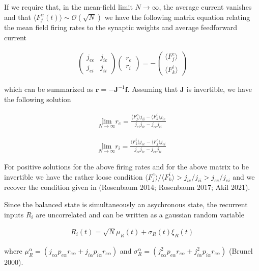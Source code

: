 \documentclass{ucetd}
\begin{document}
If we require that, in the mean-field limit $N\rightarrow\infty$, the average current vanishes and that $\langle F_{j}^{\alpha}(t)\rangle \sim \mathcal{O}(\sqrt{N})$ we have the following matrix equation relating the mean field firing rates to the synaptic weights and average feedforward current

\begin{align}
\begin{pmatrix}
j_{ee} & j_{ie}\\
j_{ei} & j_{ii}
\end{pmatrix}
\begin{pmatrix}
r_{e}\\
r_{i}
\end{pmatrix}
= 
-\begin{pmatrix}
\langle F_{j}^{e}\rangle\\
\langle F_{k}^{i}\rangle
\end{pmatrix}
\end{align}

which can be summarized as $\mathbf{r} = -\mathbf{J}^{-1}\mathbf{f}$. Assuming that $\mathbf{J}$ is invertible, we have the following solution

\begin{align}
\underset{N\rightarrow \infty}{\mathrm{lim}}r_{e} = \frac{\langle F_{j}^{e}\rangle j_{ii}-\langle F_{k}^{i}\rangle j_{ie}}{j_{ei}j_{ie} - j_{ee}j_{ii}}
\end{align}

\begin{align}
\underset{N\rightarrow \infty}{\mathrm{lim}}r_{i} = \frac{\langle F_{k}^{i}\rangle j_{ee}-\langle F_{j}^{e}\rangle j_{ei}}{j_{ei}j_{ie} - j_{ee}j_{ii}}
\end{align}

For positive solutions for the above firing rates and for the above matrix to be invertible we have the rather loose condition $\langle F_{j}^{e}\rangle/\langle F_{k}^{i}\rangle > j_{ie}/j_{ii} > j_{ee}/j_{ei}$ and we recover the condition given in (Rosenbaum 2014; Rosenbaum 2017; Akil 2021). 

Since the balanced state is simultaneously an asychronous state, the recurrent inputs $R_{i}$ are uncorrelated and can be written as a gaussian random variable

\begin{align*}
R_{i}(t) = \sqrt{N}\mu_{R}(t) + \sigma_{R}(t)\xi_{R}(t)
\end{align*}

where $\mu_{R}^{\alpha} = (j_{e\alpha}p_{e\alpha}r_{e\alpha} + j_{i\alpha}p_{i\alpha}r_{e\alpha})$ and $\sigma_{R}^{\alpha} = (j_{e\alpha}^{2}p_{e\alpha}r_{e\alpha} + j_{i\alpha}^{2}p_{i\alpha}r_{e\alpha})$ (Brunel 2000).
\end{document}
